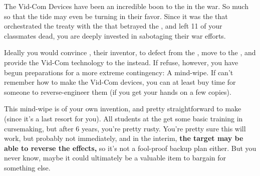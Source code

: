 \documentclass[green]{GL2020}
\begin{document}
\name{\gMindWipe{}}

The Vid-Com Devices have been an incredible boon to the \pTech{} in the war. So much so that the tide may even be turning in their favor. Since it was the \pTech{} that orchestrated the treaty with the \pFarm{} that betrayed the \pShip{}, and left 11 of your classmates dead, you are deeply invested in sabotaging their war efforts.

Ideally you would convince \cTechStar{\full}, their inventor, to defect from the \pTech{}, move to the \pShip{}, and provide the Vid-Com technology to the \pShippies{} instead. If \cTechStar{\they} refuse, however, you have begun preparations for a more extreme contingency: A mind-wipe. If \cTechStar{} can’t remember how to make the Vid-Com devices, you can at least buy time for someone to reverse-engineer them (if you get your hands on a few copies).

This mind-wipe is of your own invention, and pretty straightforward to make (since it’s a last resort for you). All students at the \pSchool{} get some basic training in cursemaking, but after 6 years, you’re pretty rusty. You’re pretty sure this will work, but probably not immediately, and in the interim, \textbf{the target may be able to reverse the effects,} so it’s not a fool-proof backup plan either. But you never know, maybe it could ultimately be a valuable item to bargain for something else.
\end{document}
